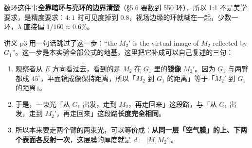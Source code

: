 \documentclass[11pt]{ctexart}
\begin{document}
数环这件事\textbf{全靠暗环与亮环的边界清楚}（§5.6 要数到 550 环），所以 1:1 不是美学要求，是精度要求：\(4:1\) 时可见度掉到 0.8，视场边缘的环就糊在一起，少数一环，\(\lambda\) 直接偏 \(1/160\approx0.6\%\)。


讲义 p3 用一句话跳过了这一步：``the \(M_2'\) is the virtual image of \(M_2\) reflected by \(G_1\)''。这一步是本实验全部公式的地基，这里把它补成可以自己复述的三句：

\begin{enumerate}
\item 观察者从 \(E\) 方向看过去，看到的是 \(M_2\) 在 \(G_1\) 里的\textbf{镜像} \(M_2'\)。因为 \(G_1\) 与两臂都成 \(45^\circ\)，平面镜成像保持距离，所以「\(M_2\) 到 \(G_1\) 的距离」等于「\(M_2'\) 到 \(G_1\) 的距离」。
\item 于是，一束光「从 \(G_1\) 出发，走到 \(M_2\)，再走回来」这段路，与「从 \(G_1\) 出发，走到 \(M_2'\)，再走回来」这段路\textbf{长度完全相同}。
\item 所以本来要走两个臂的两束光，可以等价成：\textbf{从同一层「空气膜」的上、下两个表面各反射一次}，这层膜的厚度就是 \(d=|M_1M_2'|\)。
\end{enumerate}
\end{document}
